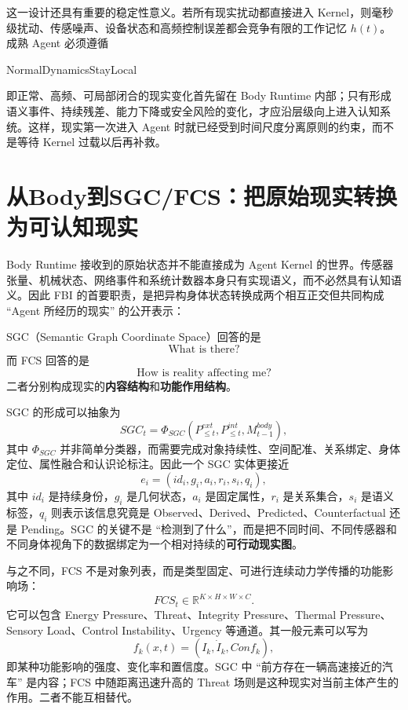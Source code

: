 这一设计还具有重要的稳定性意义。若所有现实扰动都直接进入 Kernel，则毫秒级扰动、传感噪声、设备状态和高频控制误差都会竞争有限的工作记忆 $h(t)$。成熟 Agent 必须遵循
\begin{statementbox}
NormalDynamicsStayLocal
\end{statementbox}
即正常、高频、可局部闭合的现实变化首先留在 Body Runtime 内部；只有形成语义事件、持续残差、能力下降或安全风险的变化，才应沿层级向上进入认知系统。这样，现实第一次进入 Agent 时就已经受到时间尺度分离原则的约束，而不是等待 Kernel 过载以后再补救。


\section{从Body到SGC/FCS：把原始现实转换为可认知现实}

Body Runtime 接收到的原始状态并不能直接成为 Agent Kernel 的世界。传感器张量、机械状态、网络事件和系统计数器本身只有实现语义，而不必然具有认知语义。因此 FBI 的首要职责，是把异构身体状态转换成两个相互正交但共同构成 ``Agent 所经历的现实'' 的公开表示：
\begin{statementbox}
\centering
{}
\end{statementbox}
SGC（Semantic Graph Coordinate Space）回答的是
\[
\text{What is there?}
\]
而 FCS 回答的是
\[
\text{How is reality affecting me?}
\]
二者分别构成现实的\textbf{内容结构}和\textbf{功能作用结构}。

SGC 的形成可以抽象为
\[
SGC_t
=
\Phi_{SGC}
\left(
P^{ext}_{\leq t},
P^{int}_{\leq t},
M^{body}_{t-1}
\right),
\]
其中 $\Phi_{SGC}$ 并非简单分类器，而需要完成对象持续性、空间配准、关系绑定、身体定位、属性融合和认识论标注。因此一个 SGC 实体更接近
\[
e_i=
\left(
id_i,
g_i,
a_i,
r_i,
s_i,
q_i
\right),
\]
其中 $id_i$ 是持续身份，$g_i$ 是几何状态，$a_i$ 是固定属性，$r_i$ 是关系集合，$s_i$ 是语义标签，$q_i$ 则表示该信息究竟是 Observed、Derived、Predicted、Counterfactual 还是 Pending。SGC 的关键不是 ``检测到了什么''，而是把不同时间、不同传感器和不同身体视角下的数据绑定为一个相对持续的\textbf{可行动现实图}。

与之不同，FCS 不是对象列表，而是类型固定、可进行连续动力学传播的功能影响场：
\[
FCS_t
\in
\mathbb R^{K\times H\times W\times C}.
\]
它可以包含 Energy Pressure、Threat、Integrity Pressure、Thermal Pressure、Sensory Load、Control Instability、Urgency 等通道。其一般元素可以写为
\[
f_{k}(x,t)
=
\left(
I_k,
\dot I_k,
Conf_k
\right),
\]
即某种功能影响的强度、变化率和置信度。SGC 中 ``前方存在一辆高速接近的汽车'' 是内容；FCS 中随距离迅速升高的 Threat 场则是这种现实对当前主体产生的作用。二者不能互相替代。


